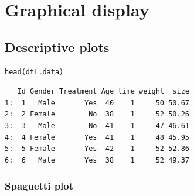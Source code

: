 \documentclass{article}
\begin{document}
\section{Graphical display}
\label{sec:org8461b48}
\subsection{Descriptive plots}
\label{sec:org44af837}

\lstset{language=r,label= ,caption= ,captionpos=b,numbers=none}
\begin{lstlisting}
head(dtL.data)
\end{lstlisting}

\begin{verbatim}
   Id Gender Treatment Age time weight  size
1:  1   Male       Yes  40    1     50 50.67
2:  2 Female        No  38    1     52 50.26
3:  3   Male        No  41    1     47 46.61
4:  4 Female       Yes  41    1     48 45.95
5:  5 Female       Yes  42    1     52 52.86
6:  6   Male       Yes  38    1     52 49.37
\end{verbatim}

\subsubsection{Spaguetti plot}
\label{sec:org617837a}
\end{document}

